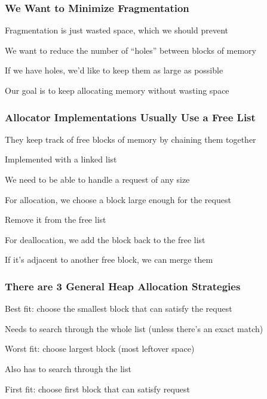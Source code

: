   \begin{frame}
    \frametitle{We Want to Minimize Fragmentation}

    Fragmentation is just wasted space, which we should prevent

    \vspace{2em}

    We want to reduce the number of ``holes'' between blocks of memory

    \hspace{2em} If we have holes, we'd like to keep them as large as possible

    \vspace{2em}

    Our goal is to keep allocating memory without wasting space
  \end{frame}

  \begin{frame}
    \frametitle{Allocator Implementations Usually Use a Free List}

    They keep track of free blocks of memory by chaining them together

    \hspace{2em} Implemented with a linked list

    \vspace{2em}

    We need to be able to handle a request of any size

    \vspace{2em}

    For allocation, we choose a block large enough for the request

    \hspace{2em} Remove it from the free list

    \vspace{2em}

    For deallocation, we add the block back to the free list

    \hspace{2em} If it's adjacent to another free block, we can merge them
  \end{frame}

  \begin{frame}
    \frametitle{There are 3 General Heap Allocation Strategies}

    Best fit: choose the smallest block that can satisfy the request

    \hspace{2em} Needs to search through the whole list (unless there's an
    exact match)

    \vspace{2em}

    Worst fit: choose largest block (most leftover space)

    \hspace{2em} Also has to search through the list

    \vspace{2em}
    
    First fit: choose first block that can satisfy request
  \end{frame}

